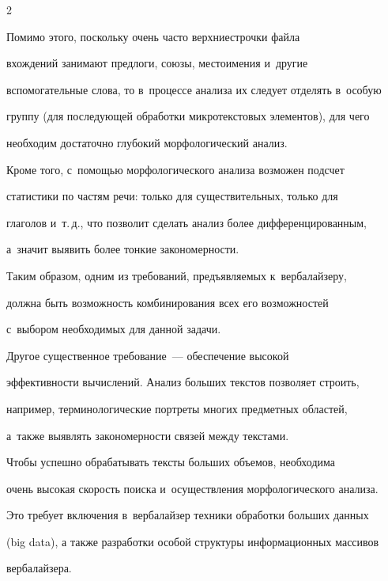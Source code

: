 \begin{multicols}{2}
     


     Помимо этого, поскольку очень часто верхние\linebreak строчки файла 


вхождений занимают предлоги, союзы, местоимения и~другие 


вспомогательные слова, то в~процессе анализа их следует отделять в~особую 


группу (для последующей обработки \mbox{микротекстовых} элементов), для чего 


необходим достаточно глубокий морфологический анализ. 


     


     Кроме того, с~помощью морфологического анализа возможен подсчет 


статистики по частям речи: только для существительных, только для 


глаголов и~т.\,д., что позволит сделать анализ более дифференцированным, 


а~значит выявить более тонкие закономерности.


     


     Таким образом, одним из требований, предъявляемых к~вербалайзеру, 


должна быть возможность комбинирования всех его возможностей 


с~выбором необходимых для данной задачи.


     


     Другое существенное требование~--- обеспечение высокой 


эффективности вычислений. Анализ больших текстов позволяет строить, 


например, терминологические портреты многих предметных областей, 


а~также выявлять закономерности связей между текстами.


     


     Чтобы успешно обрабатывать тексты больших объемов, необходима 


очень высокая скорость поиска и~осуществления морфологического анализа. 


Это требует включения в~вербалайзер техники обработки больших данных 


(big data), а также разработки особой структуры информационных массивов 


вербалайзера. 



\end{multicols}
